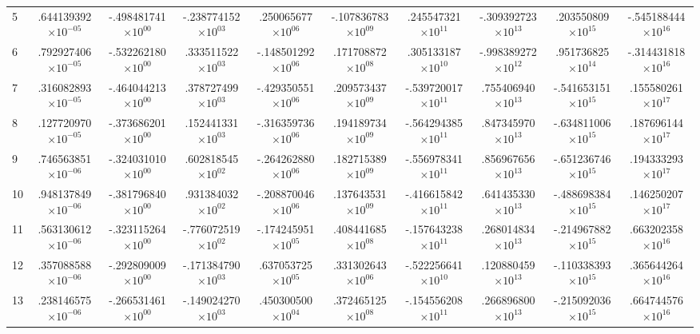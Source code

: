 \documentclass[reviewcopy]{elsarticle}
\begin{document}
\begin{landscape}
\begin{longtable}{lccccccccc}
		5   &  .644139392$\times10^{-05}$ &  -.498481741$\times10^{00}$ & -.238774152$\times10^{03}$ & .250065677$\times10^{06}$   & -.107836783$\times10^{09}$ &  .245547321$\times10^{11}$  & -.309392723$\times10^{13}$ &  .203550809$\times10^{15}$  &  -.545188444$\times10^{16}$ \\
		6   & .792927406$\times10^{-05}$  &  -.532262180$\times10^{00}$ & .333511522$\times10^{03}$  &  -.148501292$\times10^{06}$ & .171708872$\times10^{08}$  &  .305133187$\times10^{10}$  & -.998389272$\times10^{12}$ &  .951736825$\times10^{14}$  &  -.314431818$\times10^{16}$ \\
		7   & .316082893$\times10^{-05}$  &  -.464044213$\times10^{00}$ & .378727499$\times10^{03}$  &  -.429350551$\times10^{06}$ & .209573437$\times10^{09}$  &  -.539720017$\times10^{11}$ &  .755406940$\times10^{13}$ & -.541653151$\times10^{15}$  &  .155580261$\times10^{17}$  \\
		8   & .127720970$\times10^{-05}$  &  -.373686201$\times10^{00}$ & .152441331$\times10^{03}$  &  -.316359736$\times10^{06}$ &  .194189734$\times10^{09}$ &  -.564294385$\times10^{11}$ &  .847345970$\times10^{13}$ & -.634811006$\times10^{15}$  &  .187696144$\times10^{17}$  \\
		9   & .746563851$\times10^{-06}$  &  -.324031010$\times10^{00}$ & .602818545$\times10^{02}$  &  -.264262880$\times10^{06}$ &  .182715389$\times10^{09}$ &  -.556978341$\times10^{11}$ &  .856967656$\times10^{13}$ & -.651236746$\times10^{15}$  &  .194333293$\times10^{17}$  \\
		10  & .948137849$\times10^{-06}$  &  -.381796840$\times10^{00}$ & .931384032$\times10^{02}$  &  -.208870046$\times10^{06}$ &  .137643531$\times10^{09}$ &  -.416615842$\times10^{11}$ &  .641435330$\times10^{13}$ & -.488698384$\times10^{15}$  &  .146250207$\times10^{17}$  \\
		11  & .563130612$\times10^{-06}$  &  -.323115264$\times10^{00}$ & -.776072519$\times10^{02}$ &  -.174245951$\times10^{05}$ &  .408441685$\times10^{08}$ &  -.157643238$\times10^{11}$ &  .268014834$\times10^{13}$ & -.214967882$\times10^{15}$  &  .663202358$\times10^{16}$  \\
		12  & .357088588$\times10^{-06}$  &  -.292809009$\times10^{00}$ & -.171384790$\times10^{03}$ &  .637053725$\times10^{05}$  &  .331302643$\times10^{06}$ &  -.522256641$\times10^{10}$ &  .120880459$\times10^{13}$ & -.110338393$\times10^{15}$  &  .365644264$\times10^{16}$  \\
		13  & .238146575$\times10^{-06}$  &  -.266531461$\times10^{00}$ & -.149024270$\times10^{03}$ &  .450300500$\times10^{04}$  &  .372465125$\times10^{08}$ &  -.154556208$\times10^{11}$ &  .266896800$\times10^{13}$ & -.215092036$\times10^{15}$  &  .664744576$\times10^{16}$  \\

\end{longtable}
\end{landscape}
\end{document}
